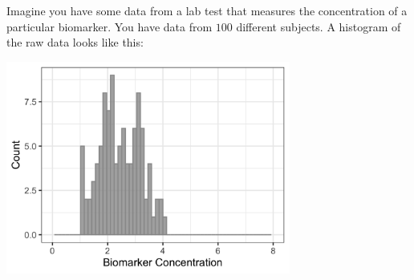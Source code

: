 Imagine you have some data from a lab test that measures the concentration of a particular biomarker. You have data from $100$ different subjects. A histogram of the raw data looks like this:
\begin{center}
\includegraphics[width=0.7\textwidth]{img/normal-likelihood-example-data.png}
\end{center}

